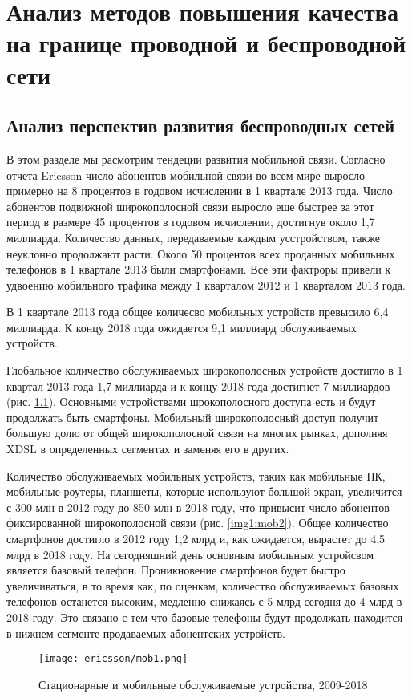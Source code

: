 \chapter{Анализ методов повышения качества на границе проводной и беспроводной сети} \label{chapt1}


\section{Анализ перспектив развития беспроводных сетей} \label{sect1_0}
В этом разделе мы расмотрим тендеции развития мобильной связи.
Согласно отчета Ericsson \cite{ericsson} число абонентов мобильной связи во всем мире выросло примерно на 8 процентов в годовом исчислении в 1 квартале 2013 года. Число абонентов подвижной широкополосной связи выросло еще быстрее за этот период в размере 45 процентов в годовом исчислении, достигнув около 1,7 миллиарда. Количество данных, передаваемые каждым усстройством, также неуклонно продолжают расти. Около 50 процентов всех проданных мобильных телефонов в 1 квартале 2013 были смартфонами. Все эти фактроры привели к удвоению мобильного трафика между 1 кварталом 2012 и 1 кварталом 2013 года. 

В 1 квартале 2013 года общее количесво мобильных устройств превысило 6,4 миллиарда. К концу 2018 года ожидается 9,1 миллиард обслуживаемых устройств. 

Глобальное количество обслуживаемых широкополосных устройств достигло в 1 квартал 2013 года 1,7 миллиарда и к концу 2018 года достигнет 7 миллиардов (рис. \ref{img1:mob1}). Основными устройствами шрокополосного доступа есть и будут продолжать быть смартфоны. Мобильный широкополосный доступ получит большую долю от общей широкополосной связи на многих рынках, дополняя XDSL в определенных сегментах и заменяя его в других. 

Количество обслуживаемых мобильных устройств, таких как мобильные ПК, мобильные роутеры, планшеты, которые используют большой экран, увеличится с 300 млн в 2012 году до 850 млн в 2018 году, что привысит число абонентов фиксированной широкополосной связи (рис. \ref{img1:mob2}).
Общее количество смартфонов достигло в 2012 году 1,2 млрд и, как ожидается, вырастет до 4,5 млрд в 2018 году. На сегодняшний день основным мобильным устройсвом является базовый телефон. Проникновение смартфонов будет быстро увеличиваться, в то время как, по оценкам, количество обслуживаемых базовых телефонов останется высоким, медленно снижаясь с 5 млрд сегодня до 4 млрд в 2018 году. Это связано с тем что базовые телефоны будут продолжать находится в нижнем сегменте продаваемых абонентских устройств.
\begin{figure} [h]
  \center
\texttt{[image: ericsson/mob1.png]}
  \caption{Стационарные и мобильные обслуживаемые устройства, 2009-2018 \cite{ericsson}}
  \label{img1:mob1}
\end{figure}


